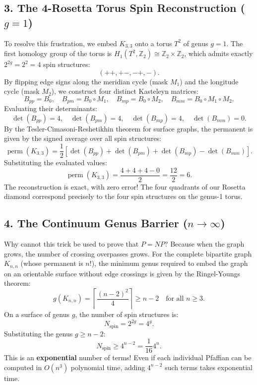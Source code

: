 \documentclass[11pt,a4paper]{article}
\theoremstyle{definition}
\begin{document}
\subsection{3. The 4-Rosetta Torus Spin Reconstruction ($g = 1$)}
To resolve this frustration, we embed $K_{3,3}$ onto a torus $T^2$ of genus $g = 1$. The first homology group of the torus is $H_1(T^2, \mathbb{Z}_2) \cong \mathbb{Z}_2 \times \mathbb{Z}_2$, which admits exactly $2^{2g} = 2^2 = 4$ spin structures:
\begin{equation}
(++, +-, -+,  - ).
\end{equation}
By flipping edge signs along the meridian cycle (mask $M_1$) and the longitude cycle (mask $M_2$), we construct four distinct Kasteleyn matrices:
\begin{equation}
B_{pp} = B_0, \quad B_{pm} = B_0 \circ M_1, \quad B_{mp} = B_0 \circ M_2, \quad B_{mm} = B_0 \circ M_1 \circ M_2.
\end{equation}
Evaluating their determinants:
\begin{equation}
\det(B_{pp}) = 4, \quad \det(B_{pm}) = 4, \quad \det(B_{mp}) = 4, \quad \det(B_{mm}) = 0.
\end{equation}
By the Tesler-Cimasoni-Reshetikhin theorem for surface graphs, the permanent is given by the signed average over all spin structures:
\begin{equation}
\operatorname{perm}(K_{3,3}) = \frac{1}{2} \left[ \det(B_{pp}) + \det(B_{pm}) + \det(B_{mp}) - \det(B_{mm}) \right].
\end{equation}
Substituting the evaluated values:
\begin{equation}
\operatorname{perm}(K_{3,3}) = \frac{4 + 4 + 4 - 0}{2} = \frac{12}{2} = 6.
\end{equation}
The reconstruction is exact, with zero error! The four quadrants of our Rosetta diamond correspond precisely to the four spin structures on the genus-1 torus.

\subsection{4. The Continuum Genus Barrier ($n \to \infty$)}
Why cannot this trick be used to prove that $P = NP$?
Because when the graph grows, the number of crossing overpasses grows. For the complete bipartite graph $K_{n,n}$ (whose permanent is $n!$), the minimum genus required to embed the graph on an orientable surface without edge crossings is given by the Ringel-Youngs theorem:
\begin{equation}
g(K_{n,n}) = \left\lceil \frac{(n-2)^2}{4} \right\rceil \ge n - 2 \quad \text{for all } n \ge 3.
\end{equation}
On a surface of genus $g$, the number of spin structures is:
\begin{equation}
N_{\mathrm{spin}} = 2^{2g} = 4^g.
\end{equation}
Substituting the genus $g \ge n - 2$:
\begin{equation}
N_{\mathrm{spin}} \ge 4^{n-2} = \frac{1}{16} 4^n.
\end{equation}
This is an \textbf{exponential} number of terms! Even if each individual Pfaffian can be computed in $O(n^3)$ polynomial time, adding $4^{n-2}$ such terms takes exponential time.
\end{document}
